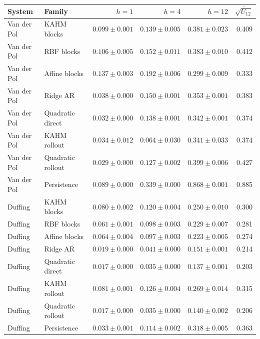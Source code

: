 \begin{tabular}{llrrrr}
\toprule
System & Family & $h=1$ & $h=4$ & $h=12$ & $\overline{\sqrt{U_{12}}}$ \\
\midrule
Van der Pol & KAHM blocks & $0.099\pm0.001$ & $0.139\pm0.005$ & $0.381\pm0.023$ & 0.409 \\
Van der Pol & RBF blocks & $0.106\pm0.005$ & $0.152\pm0.011$ & $0.383\pm0.010$ & 0.412 \\
Van der Pol & Affine blocks & $0.137\pm0.003$ & $0.192\pm0.006$ & $0.299\pm0.009$ & 0.333 \\
Van der Pol & Ridge AR & $0.038\pm0.000$ & $0.150\pm0.001$ & $0.353\pm0.001$ & 0.383 \\
Van der Pol & Quadratic direct & $0.032\pm0.000$ & $0.138\pm0.001$ & $0.342\pm0.001$ & 0.374 \\
Van der Pol & KAHM rollout & $0.034\pm0.012$ & $0.064\pm0.030$ & $0.341\pm0.033$ & 0.374 \\
Van der Pol & Quadratic rollout & $0.029\pm0.000$ & $0.127\pm0.002$ & $0.399\pm0.006$ & 0.427 \\
Van der Pol & Persistence & $0.089\pm0.000$ & $0.339\pm0.000$ & $0.868\pm0.001$ & 0.885 \\
Duffing & KAHM blocks & $0.080\pm0.002$ & $0.120\pm0.004$ & $0.250\pm0.010$ & 0.300 \\
Duffing & RBF blocks & $0.061\pm0.001$ & $0.098\pm0.003$ & $0.229\pm0.007$ & 0.281 \\
Duffing & Affine blocks & $0.064\pm0.004$ & $0.097\pm0.003$ & $0.223\pm0.005$ & 0.274 \\
Duffing & Ridge AR & $0.019\pm0.000$ & $0.041\pm0.000$ & $0.151\pm0.001$ & 0.214 \\
Duffing & Quadratic direct & $0.017\pm0.000$ & $0.035\pm0.000$ & $0.137\pm0.001$ & 0.203 \\
Duffing & KAHM rollout & $0.081\pm0.001$ & $0.126\pm0.004$ & $0.269\pm0.014$ & 0.315 \\
Duffing & Quadratic rollout & $0.017\pm0.000$ & $0.035\pm0.000$ & $0.140\pm0.002$ & 0.206 \\
Duffing & Persistence & $0.033\pm0.001$ & $0.114\pm0.002$ & $0.318\pm0.005$ & 0.363 \\
\bottomrule
\end{tabular}
